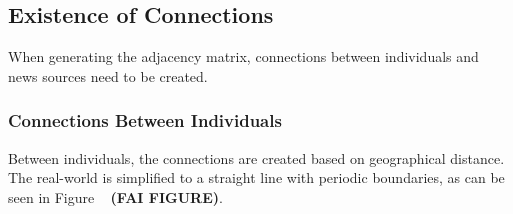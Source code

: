 \subsection{Existence of Connections}
When generating the adjacency matrix, connections between individuals and news sources need to be created.
\subsubsection{Connections Between Individuals}
Between individuals, the connections are created based on geographical distance. The real-world is simplified to a straight line with periodic boundaries, as can be seen in Figure ~ \textbf{(FAI FIGURE)}.


